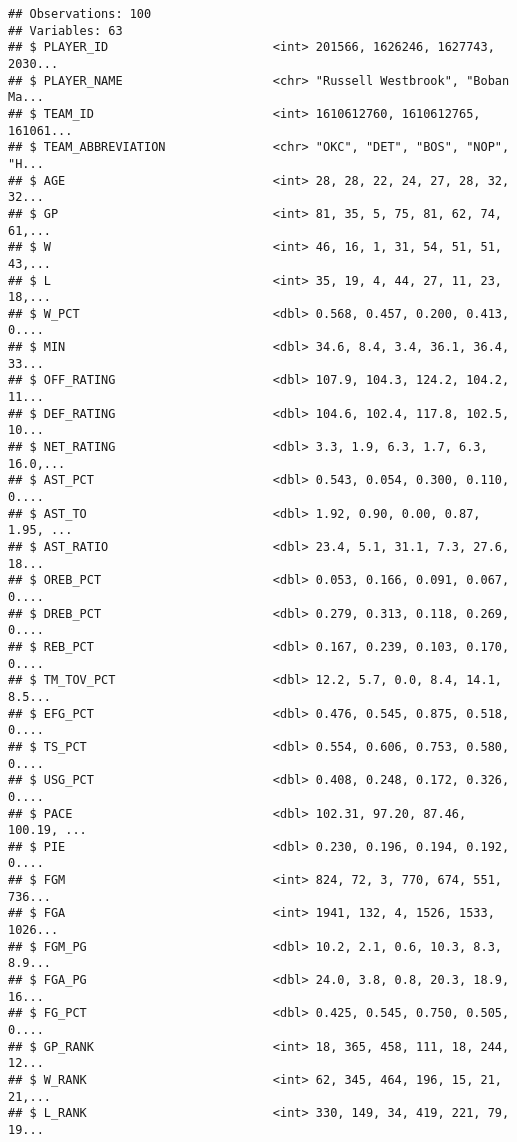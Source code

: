 \documentclass[]{article}
\begin{document}
\begin{verbatim}
## Observations: 100
## Variables: 63
## $ PLAYER_ID                       <int> 201566, 1626246, 1627743, 2030...
## $ PLAYER_NAME                     <chr> "Russell Westbrook", "Boban Ma...
## $ TEAM_ID                         <int> 1610612760, 1610612765, 161061...
## $ TEAM_ABBREVIATION               <chr> "OKC", "DET", "BOS", "NOP", "H...
## $ AGE                             <int> 28, 28, 22, 24, 27, 28, 32, 32...
## $ GP                              <int> 81, 35, 5, 75, 81, 62, 74, 61,...
## $ W                               <int> 46, 16, 1, 31, 54, 51, 51, 43,...
## $ L                               <int> 35, 19, 4, 44, 27, 11, 23, 18,...
## $ W_PCT                           <dbl> 0.568, 0.457, 0.200, 0.413, 0....
## $ MIN                             <dbl> 34.6, 8.4, 3.4, 36.1, 36.4, 33...
## $ OFF_RATING                      <dbl> 107.9, 104.3, 124.2, 104.2, 11...
## $ DEF_RATING                      <dbl> 104.6, 102.4, 117.8, 102.5, 10...
## $ NET_RATING                      <dbl> 3.3, 1.9, 6.3, 1.7, 6.3, 16.0,...
## $ AST_PCT                         <dbl> 0.543, 0.054, 0.300, 0.110, 0....
## $ AST_TO                          <dbl> 1.92, 0.90, 0.00, 0.87, 1.95, ...
## $ AST_RATIO                       <dbl> 23.4, 5.1, 31.1, 7.3, 27.6, 18...
## $ OREB_PCT                        <dbl> 0.053, 0.166, 0.091, 0.067, 0....
## $ DREB_PCT                        <dbl> 0.279, 0.313, 0.118, 0.269, 0....
## $ REB_PCT                         <dbl> 0.167, 0.239, 0.103, 0.170, 0....
## $ TM_TOV_PCT                      <dbl> 12.2, 5.7, 0.0, 8.4, 14.1, 8.5...
## $ EFG_PCT                         <dbl> 0.476, 0.545, 0.875, 0.518, 0....
## $ TS_PCT                          <dbl> 0.554, 0.606, 0.753, 0.580, 0....
## $ USG_PCT                         <dbl> 0.408, 0.248, 0.172, 0.326, 0....
## $ PACE                            <dbl> 102.31, 97.20, 87.46, 100.19, ...
## $ PIE                             <dbl> 0.230, 0.196, 0.194, 0.192, 0....
## $ FGM                             <int> 824, 72, 3, 770, 674, 551, 736...
## $ FGA                             <int> 1941, 132, 4, 1526, 1533, 1026...
## $ FGM_PG                          <dbl> 10.2, 2.1, 0.6, 10.3, 8.3, 8.9...
## $ FGA_PG                          <dbl> 24.0, 3.8, 0.8, 20.3, 18.9, 16...
## $ FG_PCT                          <dbl> 0.425, 0.545, 0.750, 0.505, 0....
## $ GP_RANK                         <int> 18, 365, 458, 111, 18, 244, 12...
## $ W_RANK                          <int> 62, 345, 464, 196, 15, 21, 21,...
## $ L_RANK                          <int> 330, 149, 34, 419, 221, 79, 19...

\end{verbatim}
\end{document}
